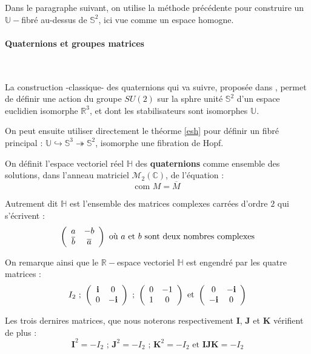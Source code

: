 
Dans le paragraphe suivant, on utilise la m\'ethode pr\'ec\'edente pour construire un $\mathbb{U}-$fibr\'e au-dessus de $\mathbb{S}^2$, ici vue comme un espace homogne.

\paragraph{Quaternions et groupes matrices}~\\

\par
La construction -classique- des quaternions qui va suivre, propos\'ee dans \cite{dev_par}, %
permet de d\'efinir une action du groupe $SU(2)$ sur la sphre unit\'e $\mathbb{S}^2$ d'un espace euclidien isomorphe  $\mathbb{R}^3$, %
et dont les stabilisateurs sont isomorphes  $\mathbb{U}$.

\par
On peut ensuite utiliser directement le th\'eorme \ref{esh} pour d\'efinir un fibr\'e principal : $\mathbb{U}\hookrightarrow\mathbb{S}^3\twoheadrightarrow\mathbb{S}^2$, %
isomorphe  une fibration de Hopf.

\ligneinter
On d\'efinit l'espace vectoriel r\'eel $\mathbb{H}$ des \textbf{quaternions} comme ensemble des solutions, %
dans l'anneau matriciel $\mathcal{M}_2(\mathbb{C})$, de l'\'equation :
\[\text{com }M=\overline{M}\]

Autrement dit $\mathbb{H}$ est l'ensemble des matrices complexes carr\'ees d'ordre $2$ qui s'\'ecrivent :
\[\left(\begin{array}{cc}a&-b\\ \overline{b}&\overline{a}\end{array}\right)\text{ o\`u $a$ et $b$ sont deux nombres complexes}\]

On remarque ainsi que le $\mathbb{R}-$espace vectoriel $\mathbb{H}$ est engendr\'e par les quatre matrices :
\[I_2\text{ ; }\left(\begin{array}{cc}\mathbf{i}&0\\0&-\mathbf{i}\end{array}\right)\text{ ; }\left(\begin{array}{cc}0&-1\\1&0\end{array}\right)\text{ et }\left(\begin{array}{cc}0&-\mathbf{i}\\-\mathbf{i}&0\end{array}\right)\]

Les trois dernires matrices, que nous noterons respectivement $\mathbf{I}$, $\mathbf{J}$ et $\mathbf{K}$ v\'erifient de plus :
\[\mathbf{I}^2=-I_2\text{ ; }\mathbf{J}^2=-I_2\text{ ; }\mathbf{K}^2=-I_2\text{ et }\mathbf{IJK}=-I_2\]


